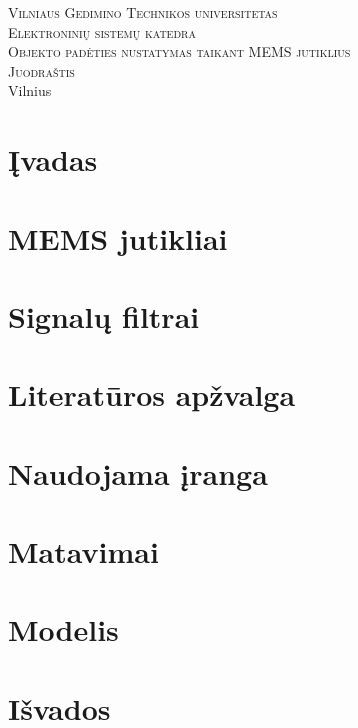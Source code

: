 \documentclass[11pt, a4paper]{article}
\begin{document}
  \begin{titlepage}
    \begin{center}
      \textsc{\LARGE Vilniaus Gedimino Technikos universitetas}\\[2mm]
      \textsc{\Large Elektroninių sistemų katedra}\\[70mm]
      \textsc{\Large Objekto padėties nustatymas taikant MEMS jutiklius}\\[60mm]
      \textsc{\Large Juodraštis}\\[60mm]
      \vfill
      {\large Vilnius \\ \the\year}
    \end{center}
  \end{titlepage}

  \tableofcontents

  \newpage

  \section{Įvadas}

  

  \section{MEMS jutikliai}

  

  \section{Signalų filtrai}

  

  \section{Literatūros apžvalga}

  

  \section{Naudojama įranga}

  

  \section{Matavimai}

  

  \section{Modelis}

  

  \section{Išvados}

  

  \newpage

  
  
\end{document}
